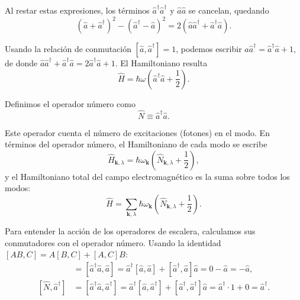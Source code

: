             Al restar estas expresiones, los términos $\hat{a}^\dagger\hat{a}^\dagger$ y $\hat{a}\hat{a}$ se cancelan, quedando
            \begin{equation}
                (\hat{a} + \hat{a}^\dagger)^2 - (\hat{a}^\dagger - \hat{a})^2 = 2(\hat{a}\hat{a}^\dagger + \hat{a}^\dagger\hat{a}).
            \end{equation}
            
            Usando la relación de conmutación $[\hat{a}, \hat{a}^\dagger] = 1$, podemos escribir $\hat{a}\hat{a}^\dagger = \hat{a}^\dagger\hat{a} + 1$, de donde $\hat{a}\hat{a}^\dagger + \hat{a}^\dagger\hat{a} = 2\hat{a}^\dagger\hat{a} + 1$. El Hamiltoniano resulta
            \begin{equation}
                \hat{H} = \hbar\omega\left(\hat{a}^\dagger\hat{a} + \frac{1}{2}\right).
            \end{equation}

            Definimos el operador número como
            \begin{equation}
                \hat{N} \equiv \hat{a}^\dagger\hat{a}.
            \end{equation}
            
            Este operador cuenta el número de excitaciones (fotones) en el modo. En términos del operador número, el Hamiltoniano de cada modo se escribe
            \begin{equation}
                \hat{H}_{\mathbf{k},\lambda} = \hbar\omega_{\mathbf{k}}\left(\hat{N}_{\mathbf{k},\lambda} + \frac{1}{2}\right),
            \end{equation}
            y el Hamiltoniano total del campo electromagnético es la suma sobre todos los modos:
            \begin{equation}
                \hat{H} = \sum_{\mathbf{k},\lambda} \hbar\omega_{\mathbf{k}}\left(\hat{N}_{\mathbf{k},\lambda} + \frac{1}{2}\right).
            \end{equation}
            
            Para entender la acción de los operadores de escalera, calculamos sus conmutadores con el operador número. Usando la identidad $[AB, C] = A[B, C] + [A, C]B$:
            \begin{align}
                [\hat{N}, \hat{a}] &= [\hat{a}^\dagger\hat{a}, \hat{a}] = \hat{a}^\dagger[\hat{a}, \hat{a}] + [\hat{a}^\dagger, \hat{a}]\hat{a} = 0 - \hat{a} = -\hat{a}, \\
                [\hat{N}, \hat{a}^\dagger] &= [\hat{a}^\dagger\hat{a}, \hat{a}^\dagger] = \hat{a}^\dagger[\hat{a}, \hat{a}^\dagger] + [\hat{a}^\dagger, \hat{a}^\dagger]\hat{a} = \hat{a}^\dagger \cdot 1 + 0 = \hat{a}^\dagger.
            \end{align}
            
